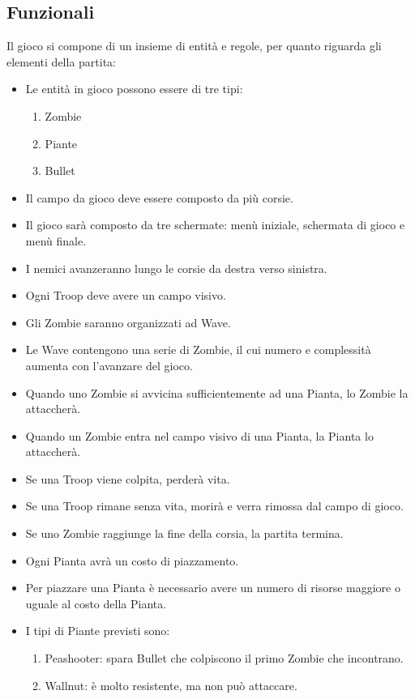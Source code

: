 \subsection{Funzionali}
Il gioco si compone di un insieme di entità e regole, per quanto riguarda gli elementi della partita:
\begin{itemize}
    \item Le entità in gioco possono essere di tre tipi:
    \begin{enumerate}
        \item Zombie
        \item Piante
        \item Bullet
    \end{enumerate}
    \item Il campo da gioco deve essere composto da più corsie.
    \item Il gioco sarà composto da tre schermate: menù iniziale, schermata di gioco e menù finale.
    \item I nemici avanzeranno lungo le corsie da destra verso sinistra.
    \item Ogni Troop deve avere un campo visivo.
    \item Gli Zombie saranno organizzati ad Wave.
    \item Le Wave contengono una serie di Zombie, il cui numero e complessità aumenta con l'avanzare del gioco.
    \item Quando uno Zombie si avvicina sufficientemente ad una Pianta, lo Zombie la attaccherà.
    \item Quando un Zombie entra nel campo visivo di una Pianta, la Pianta lo attaccherà.
    \item Se una Troop viene colpita, perderà vita.
    \item Se una Troop rimane senza vita, morirà e verra rimossa dal campo di gioco.
    \item Se uno Zombie raggiunge la fine della corsia, la partita termina.
    \item Ogni Pianta avrà un costo di piazzamento.
    \item Per piazzare una Pianta è necessario avere un numero di risorse maggiore o uguale al costo della Pianta. 
    \item I tipi di Piante previsti sono:
    \begin{enumerate}
        \item Peashooter: spara Bullet che colpiscono il primo Zombie che incontrano.
        \item Wallnut: è molto resistente, ma non può attaccare.

\end{enumerate}
\end{itemize}
